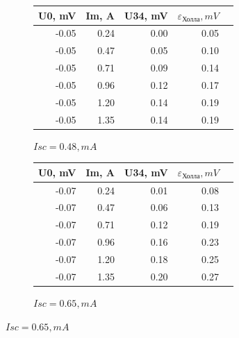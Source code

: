 \documentclass[a4paper, 12pt]{article}
\begin{document}
\begin{figure}[ht]
    \begin{subfigure}[b]{0.45\textwidth}
        \centering
        \begin{tabular}{|r|r|r|r|r|}
        \toprule
        U0, mV & Im, A & U34, mV & $\varepsilon_\text{Холла}, mV$ \\
        \midrule
        -0.05 & 0.24 & 0.00 & 0.05 \\
        -0.05 & 0.47 & 0.05 & 0.10 \\
        -0.05 & 0.71 & 0.09 & 0.14 \\
        -0.05 & 0.96 & 0.12 & 0.17 \\
        -0.05 & 1.20 & 0.14 & 0.19 \\
        -0.05 & 1.35 & 0.14 & 0.19 \\
        \bottomrule
        \end{tabular}
        \caption{$Isc = 0.48, mA$}
    \end{subfigure}
    \hfill
    \begin{subfigure}[b]{0.45\textwidth}
        \centering
        \begin{tabular}{|r|r|r|r|r|}
        \toprule
        U0, mV & Im, A & U34, mV & $\varepsilon_\text{Холла}, mV$ \\
        \midrule
        -0.07 & 0.24 & 0.01 & 0.08 \\
        -0.07 & 0.47 & 0.06 & 0.13 \\
        -0.07 & 0.71 & 0.12 & 0.19 \\
        -0.07 & 0.96 & 0.16 & 0.23 \\
        -0.07 & 1.20 & 0.18 & 0.25 \\
        -0.07 & 1.35 & 0.20 & 0.27 \\
        \bottomrule
        \end{tabular}
        \caption{$Isc = 0.65, mA$}
    \end{subfigure}


\end{figure}
\end{document}
